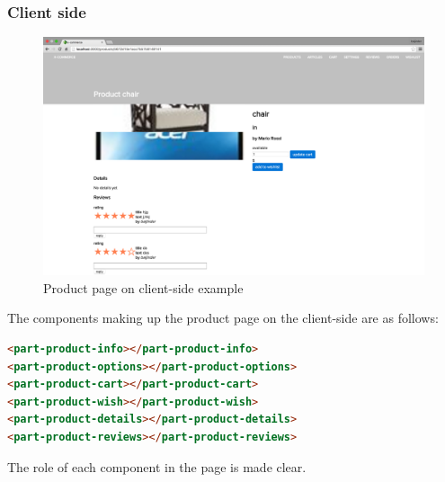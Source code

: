 \subsubsection{Client side}
\begin{figure}[htb]
\centering
\includegraphics[width=0.9\linewidth]{images/chapter4/product-page-ex4.png}\hfill
\caption[Product page on client-side]{Product page on client-side example}
\label{fig:design_page_prod_cli}
\end{figure}
The components making up the product page on the client-side are as follows:
\begin{lstlisting}[language=html]
<part-product-info></part-product-info>
<part-product-options></part-product-options>
<part-product-cart></part-product-cart>
<part-product-wish></part-product-wish>
<part-product-details></part-product-details>
<part-product-reviews></part-product-reviews>
\end{lstlisting}
The role of each component in the page is made clear.